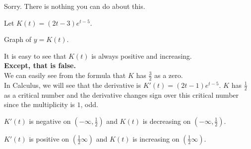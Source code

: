 \documentclass{ximera}
\begin{document}
Sorry.  There is nothing you can do about this.





\begin{example}


Let $K(t) = (2t-3)e^{t-5}$.


Graph of $y = K(t)$.



\begin{image}
\end{image}



It is easy to see that $K(t)$ is always positive and increasing. \\

\textbf{\textcolor{red!80!black}{Except, that is false.}} \\

We can easily see from the formula that $K$ has $\frac{3}{2}$ as a zero.\\


In Calculus, we will see that the derivative is $K'(t) = (2t-1)e^{t-5}$.   $K$ has $\frac{1}{2}$ as a critical number and the derivative changes sign over this critical number since the multiplicity is $1$, odd.

$K'(t)$ is negative on $\left( -\infty, \frac{1}{2} \right)$ and $K(t)$ is decreasing on $\left( -\infty, \frac{1}{2} \right)$.

$K'(t)$ is positive on $\left(\frac{1}{2} \infty \right)$ and $K(t)$ is increasing on $\left(\frac{1}{2} \infty \right)$.



\end{example}
\end{document}
